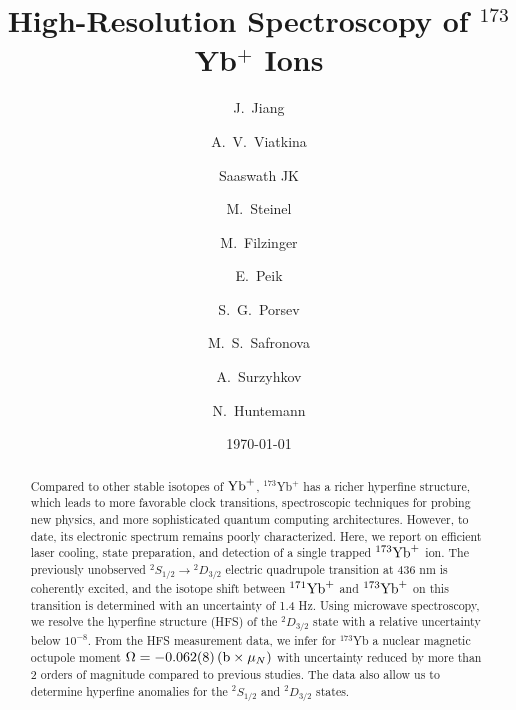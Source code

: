 \documentclass[
reprint,
superscriptaddress,









amsmath,amssymb,
aps,prl






]{revtex4-2}
\begin{document}

\title{\textbf{High-Resolution Spectroscopy of $^{173}$Yb$^{+}$ Ions} }

\author{J.~Jiang}
\author{A.~V.~Viatkina}
\author{Saaswath JK}
\author{M.~Steinel}
\author{M.~Filzinger}
\author{E.~Peik}
\author{S.~G.~Porsev}
\author{M.~S.~Safronova}
\author{A.~Surzyhkov}
\author{N.~Huntemann}




\date{\today}


\begin{abstract}
Compared to other stable isotopes of $\rm{Yb}^+$, $^{173}$Yb$^+$ has a richer hyperfine structure, which leads to more favorable clock transitions, spectroscopic techniques for probing new physics, and more sophisticated quantum computing architectures.
However, to date, its electronic spectrum remains poorly characterized. Here, we report on efficient laser cooling, state preparation, and detection of a single trapped $^{173}\rm{Yb}^+$ ion. The previously unobserved $^2\!S_{1/2} \rightarrow {}^2\!D_{3/2}$ electric quadrupole transition at 436 nm is coherently excited, and the isotope shift between $^{171}\rm{Yb}^+$ and $^{173}\rm{Yb}^+$ on this transition is determined with an uncertainty of 1.4 Hz. Using microwave spectroscopy, we resolve the hyperfine structure (HFS) of the ${}^2\!D_{3/2}$ state with a relative uncertainty below $10^{-8}$.
From the HFS measurement data, we infer for ${}^{173}$Yb a nuclear magnetic octupole moment $\Omega = -0.062(8)\,({\rm b} \times \mu_N)$ with uncertainty reduced by more than 2 orders of magnitude compared to previous studies.
The data also allow us to determine hyperfine anomalies for the ${}^2\!S_{1/2}$ and ${}^2\!D_{3/2}$ states.
\end{abstract}
\end{document}
